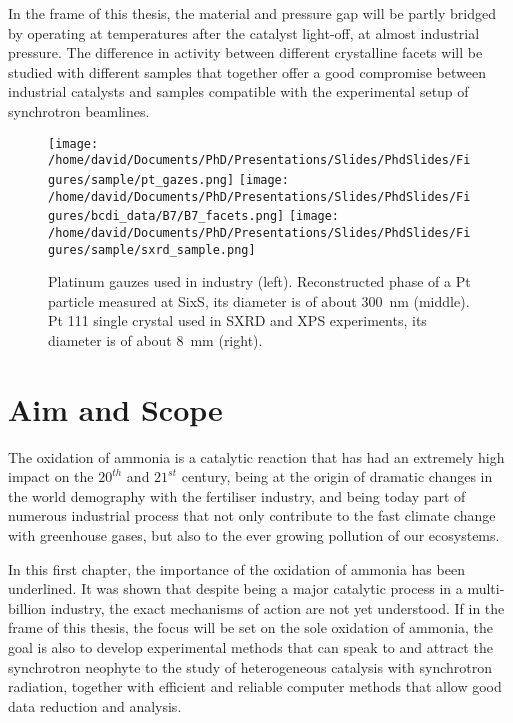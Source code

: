 In the frame of this thesis, the material and pressure gap will be partly bridged by operating at temperatures after the catalyst light-off, at almost industrial pressure.
The difference in activity between different crystalline facets will be studied with different samples that together offer a good compromise between industrial catalysts and samples compatible with the experimental setup of synchrotron beamlines.

\begin{figure}[!htb]
    \centering
    \texttt{[image: /home/david/Documents/PhD/Presentations/Slides/PhdSlides/Figures/sample/pt\_gazes.png]}
    \texttt{[image: /home/david/Documents/PhD/Presentations/Slides/PhdSlides/Figures/bcdi\_data/B7/B7\_facets.png]}
    \texttt{[image: /home/david/Documents/PhD/Presentations/Slides/PhdSlides/Figures/sample/sxrd\_sample.png]}
    \caption{
    Platinum gauzes used in industry (left).
    Reconstructed phase of a Pt particle measured at SixS, its diameter is of about \qty{300}{\nm} (middle).
    Pt 111 single crystal used in SXRD and XPS experiments, its diameter is of about \qty{8}{\mm} (right).
    }
\end{figure}

\section{Aim and Scope}

The oxidation of ammonia is a catalytic reaction that has had an extremely high impact on the $20^{th}$ and $21^{st}$ century, being at the origin of dramatic changes in the world demography with the fertiliser industry, and being today part of numerous industrial process that not only contribute to the fast climate change with greenhouse gases, but also to the ever growing pollution of our ecosystems.

In this first chapter, the importance of the oxidation of ammonia has been underlined.
It was shown that despite being a major catalytic process in a multi-billion industry, the exact mechanisms of action are not yet understood.
If in the frame of this thesis, the focus will be set on the sole oxidation of ammonia, the goal is also to develop experimental methods that can speak to and attract the synchrotron neophyte to the study of heterogeneous catalysis with synchrotron radiation, together with efficient and reliable computer methods that allow good data reduction and analysis.

